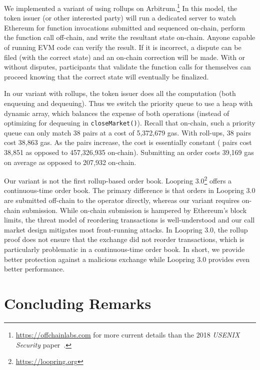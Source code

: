 We implemented a variant of \cm using rollups on Arbitrum.\footnote{\url{https://offchainlabs.com} for more current details than the 2018 \textit{USENIX Security} paper~\cite{kalodner2018arbitrum}.} In this model, the token issuer (or other interested party) will run a dedicated server to watch Ethereum for function invocations submitted and sequenced on-chain, perform the function call off-chain, and write the resultant state on-chain. Anyone capable of running EVM code can verify the result. If it is incorrect, a dispute can be filed (with the correct state) and an on-chain correction will be made. With or without disputes, participants that validate the function calls for themselves can proceed knowing that the correct state will eventually be finalized. 

In our \cm variant with rollups, the token issuer does all the computation (both enqueuing and dequeuing). Thus we switch the priority queue to use a heap with dynamic array, which balances the expense of both operations (instead of optimizing for dequeuing in \texttt{closeMarket()}). Recall that on-chain, such a priority queue can only match 38 pairs at a cost of 5,372,679 gas. With roll-ups, 38 pairs cost 38,863 gas. As the pairs increase, the cost is essentially constant ( pairs cost 38,851 as opposed to 457,326,935 on-chain). Submitting an order costs 39,169 gas on average as opposed to 207,932 on-chain.

Our \cm variant is not the first rollup-based order book. Loopring 3.0\footnote{\url{https://loopring.org}} offers a continuous-time order book. The primary difference is that orders in Loopring 3.0 are submitted off-chain to the operator directly, whereas our variant requires on-chain submission. While on-chain submission is hampered by Ethereum's block limits, the threat model of reordering transactions is well-understood and our call market design mitigates most front-running attacks. In Loopring 3.0, the rollup proof does not ensure that the exchange did not reorder transactions, which is particularly problematic in a continuous-time order book. In short, we provide better protection against a malicious exchange while Loopring 3.0 provides even better performance.


\section{Concluding Remarks} 

